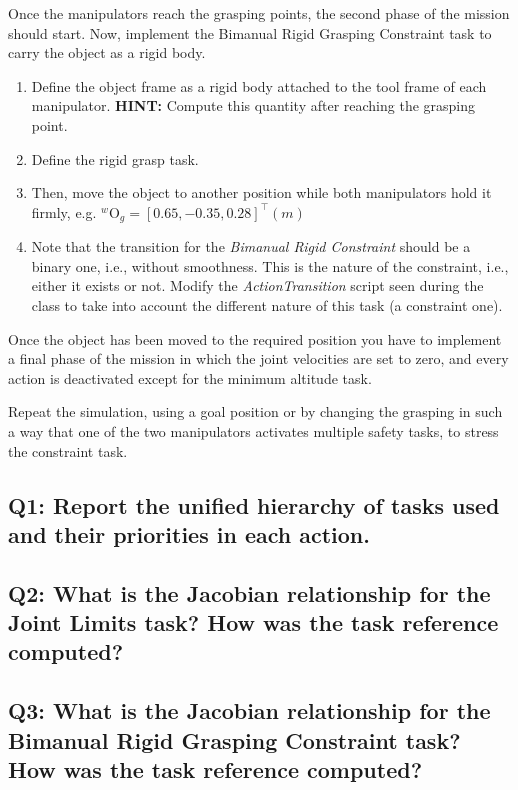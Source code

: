 \documentclass{article}
\begin{document}
Once the manipulators reach the grasping points, the second phase of the mission should start. Now, implement the Bimanual Rigid Grasping Constraint task to carry the object as a rigid body. 
\begin{enumerate}
	\item Define the object frame as a rigid body attached to the tool frame of each manipulator. \textbf{HINT:} Compute this quantity after reaching the grasping point.
	\item Define the rigid grasp task.
	\item Then, move the object to another position while both manipulators hold it firmly, e.g. $ ^{w}\textrm{O}_{g} = [0.65, -0.35, 0.28]^{\top}(m)$
	\item Note that the transition for the \textit{Bimanual Rigid Constraint} should be a binary one, i.e., without smoothness. This is the nature of the constraint, i.e., either it exists or not. Modify the \emph{ActionTransition} script seen during the class to take into account the different nature of this task (a constraint one).
	
	
\end{enumerate}
 
Once the object has been moved to the required position you have to implement a final phase of the mission in which the joint velocities are set to zero, and every action is deactivated except for the minimum altitude task.

Repeat the simulation, using a goal position or by changing the grasping in such a way that one of the two manipulators activates multiple safety tasks, to stress the constraint task.

\subsection{Q1: Report the unified hierarchy of tasks used and their priorities in each action.}

\subsection{Q2: What is the Jacobian relationship for the Joint Limits task? How was the task reference computed?}

\subsection{Q3: What is the Jacobian relationship for the Bimanual Rigid Grasping Constraint task? How was the task reference computed?}
\end{document}

